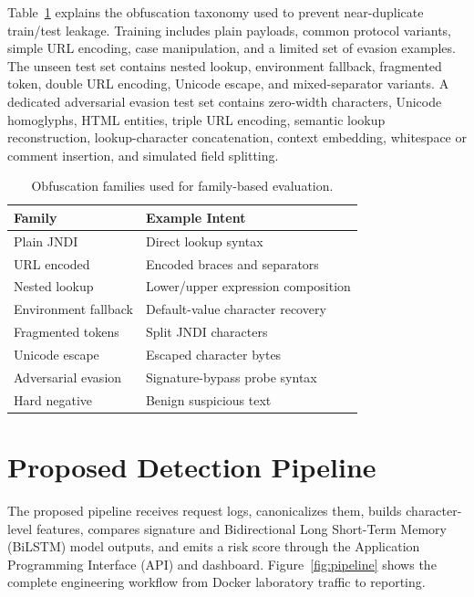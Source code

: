 \documentclass[conference]{IEEEtran}
\begin{document}
Table~\ref{tab:taxonomy} explains the obfuscation taxonomy used to prevent
near-duplicate train/test leakage. Training includes plain payloads, common
protocol variants, simple URL encoding, case manipulation, and a limited set
of evasion examples. The unseen test set contains nested lookup, environment
fallback, fragmented token, double URL encoding, Unicode escape, and
mixed-separator variants. A dedicated adversarial evasion test set contains
zero-width characters, Unicode homoglyphs, HTML entities, triple URL encoding,
semantic lookup reconstruction, lookup-character concatenation, context
embedding, whitespace or comment insertion, and simulated field splitting.

\begin{table}[!t]
\caption{Obfuscation families used for family-based evaluation.}
\label{tab:taxonomy}
\centering
\begin{tabular}{ll}
\toprule
Family & Example Intent \\
\midrule
Plain JNDI & Direct lookup syntax \\
URL encoded & Encoded braces and separators \\
Nested lookup & Lower/upper expression composition \\
Environment fallback & Default-value character recovery \\
Fragmented tokens & Split JNDI characters \\
Unicode escape & Escaped character bytes \\
Adversarial evasion & Signature-bypass probe syntax \\
Hard negative & Benign suspicious text \\
\bottomrule
\end{tabular}
\end{table}

\section{Proposed Detection Pipeline}

The proposed pipeline receives request logs, canonicalizes them, builds
character-level features, compares signature and Bidirectional Long Short-Term
Memory (BiLSTM) model outputs, and emits a risk score through the Application
Programming Interface (API) and dashboard. Figure~\ref{fig:pipeline} shows the
complete engineering workflow from Docker laboratory traffic to reporting.
\end{document}
